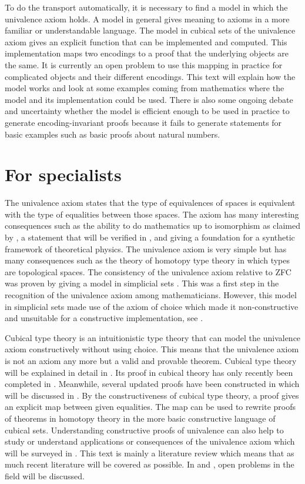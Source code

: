 \documentclass[12pt,a4paper,twoside,xetex]{book} %
\begin{document}
To do the transport automatically, it is necessary to find a model in which the univalence axiom holds. A model in general gives meaning to axioms in a more familiar or understandable language. The model in cubical sets of the univalence axiom gives an explicit function that can be implemented and computed. This implementation maps two encodings to a proof that the underlying objects are the same. It is currently an open problem to use this mapping in practice for complicated objects and their different encodings. This text will explain how the model works and look at some examples coming from mathematics where the model and its implementation could be used. There is also some ongoing debate and uncertainty whether the model is efficient enough to be used in practice to generate encoding-invariant proofs because it fails to generate statements for basic examples such as basic proofs about natural numbers.

\section*{For specialists}

The univalence axiom states that the type of equivalences of spaces is equivalent with the type of equalities between those spaces. The axiom has many interesting consequences such as the ability to do mathematics up to isomorphism as claimed by \cite{Voevodsky2013}, a statement that will be verified in , and giving a foundation for a synthetic framework of theoretical physics. The univalence axiom is very simple but has many consequences such as the theory of homotopy type theory in which types are topological spaces. The  consistency of the univalence axiom relative to ZFC was proven by giving a model in simplicial sets \cite{Kapulkin2012}. This was a first step in the recognition of the univalence axiom among mathematicians. However, this model in simplicial sets made use of the axiom of choice which made it non-constructive and unsuitable for a constructive implementation, see .

Cubical type theory is an intuitionistic type theory that can model the univalence axiom constructively without using choice. This means that the univalence axiom is not an axiom any more but a valid and provable theorem. Cubical type theory will be explained in detail in . Its proof in cubical theory has only recently been completed in \cite{Cohen2016}. Meanwhile, several updated proofs have been constructed in \cite{Sterling2018b, Moertberg2018} which will be discussed in . By the constructiveness of cubical type theory, a proof gives an explicit map between given equalities. The map can be used to rewrite proofs of theorems in homotopy theory in the more basic constructive language of cubical sets. Understanding constructive proofs of univalence can also help to study or understand applications or consequences of the univalence axiom which will be surveyed in . This text is mainly a literature review which means that as much recent literature will be covered as possible. In  and , open problems in the field will be discussed.
\end{document}
